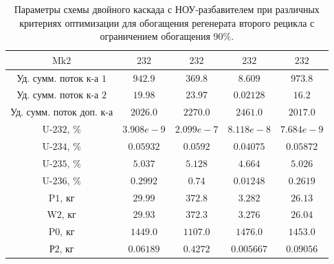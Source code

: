 \begin{table}
\begin{tabular}{ccccc}
        $\text{Mk2}$ & $232$ & $232$ & $232$ & $232$\\ \hline
        $\text{Уд. сумм. поток к-а 1}$ & $942.9$ & $369.8$ & $8.609$ & $973.8$\\ \hline
        $\text{Уд. сумм. поток к-а 2}$ & $19.98$ & $23.97$ & $0.02128$ & $16.2$\\ \hline
        $\text{Уд. сумм. поток доп. к-а}$ & $2026.0$ & $2270.0$ & $2461.0$ & $2017.0$\\ \hline
        $\text{U-232, \%}$ & $3.908e-9$ & $2.099e-7$ & $8.118e-8$ & $7.684e-9$\\ \hline
        $\text{U-234, \%}$ & $0.05932$ & $0.0592$ & $0.04075$ & $0.05872$\\ \hline
        $\text{U-235, \%}$ & $5.037$ & $5.128$ & $4.664$ & $5.026$\\ \hline
        $\text{U-236, \%}$ & $0.2992$ & $0.74$ & $0.01248$ & $0.2619$\\ \hline
        $\text{P1, кг}$ & $29.99$ & $372.8$ & $3.282$ & $26.13$\\ \hline
        $\text{W2, кг}$ & $29.93$ & $372.3$ & $3.276$ & $26.04$\\ \hline
        $\text{P0, кг}$ & $1449.0$ & $1107.0$ & $1476.0$ & $1453.0$\\ \hline
        $\text{Р2, кг}$ & $0.06189$ & $0.4272$ & $0.005667$ & $0.09056$ \\ \hline
        \end{tabular}        
\caption{Параметры схемы двойного каскада с НОУ-разбавителем при различных критериях оптимизации для обогащения регенерата второго рецикла с ограничением обогащения 90\%.{\label{2opt2_90}}}
\end{table}


